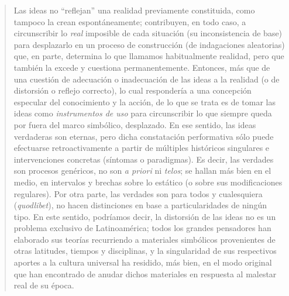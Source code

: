 \begin{quote}
Las ideas no \enquote{reflejan}  una realidad previamente constituida, como tampoco la crean espontáneamente; contribuyen, en todo caso, a circunscribir lo \emph{real} imposible de cada situación (su inconsistencia de base) para desplazarlo en un proceso de construcción (de indagaciones aleatorias) que, en parte, determina lo que llamamos habitualmente realidad, pero que también la excede y cuestiona permanentemente. Entonces, más que de una cuestión de adecuación o inadecuación de las ideas a la realidad (o de distorsión o reflejo correcto), lo cual respondería a una concepción especular del conocimiento y la acción, de lo que se trata es de tomar las ideas como \emph{instrumentos de uso} para circunscribir lo que siempre queda por fuera del marco simbólico, desplazado. En ese sentido, las ideas verdaderas son eternas, pero dicha constatación performativa sólo puede efectuarse retroactivamente a partir de múltiples históricos singulares e intervenciones concretas (síntomas o paradigmas). Es decir, las verdades son procesos genéricos, no son \emph{a priori} ni \emph{telos}; se hallan más bien en el medio, en intervalos y brechas sobre lo estático (o sobre sus modificaciones regulares). Por otra parte, las verdades son para todos y cualesquiera (\emph{quodlibet}), no hacen distinciones en base a particularidades de ningún tipo. En este sentido, podríamos decir, la distorsión de las ideas no es un problema exclusivo de Latinoamérica; todos los grandes pensadores han elaborado sus teorías recurriendo a materiales simbólicos provenientes de otras latitudes, tiempos y disciplinas, y la singularidad de sus respectivos aportes a la cultura universal ha residido, más bien, en el modo original que han encontrado de anudar dichos materiales en respuesta al malestar real de su época.


\end{quote}
